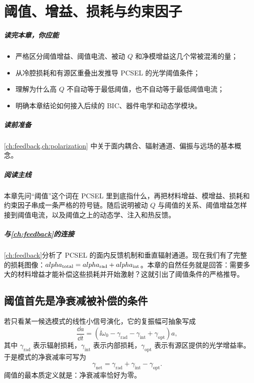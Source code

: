 ﻿%
\chapter{阈值、增益、损耗与约束因子}
\label{ch:threshold}

\paragraph{读完本章，你应能}
\begin{itemize}
  \item 严格区分阈值增益、阈值电流、被动 $Q$ 和净模增益这几个常被混淆的量；
  \item 从冷腔损耗和有源区重叠出发推导 PCSEL 的光学阈值条件；
  \item 理解为什么高 $Q$ 不自动等于最低阈值，也不自动等于最低阈值电流；
  \item 明确本章结论如何接入后续的 BIC、器件电学和动态学模块。
\end{itemize}

\paragraph{读前准备}
\cref{ch:feedback,ch:polarization} 中关于面内耦合、辐射通道、偏振与远场的基本概念。

\paragraph{阅读主线}
本章先问“阈值”这个词在 PCSEL 里到底指什么，再把材料增益、模增益、损耗和约束因子串成一条严格的符号链。随后说明被动 $Q$ 与阈值的关系、阈值增益怎样接到阈值电流，以及阈值之上的动态学、注入和热反馈。
\paragraph{与\cref{ch:feedback}的连接} \cref{ch:feedback}分析了 PCSEL 的面内反馈机制和垂直辐射通道。现在我们有了完整的损耗图像：$\alpha_{\rm total} = \alpha_{\rm rad} + \alpha_{\rm int}$。本章的自然任务就是回答：需要多大的材料增益才能补偿这些损耗并开始激射？这就引出了阈值条件的严格推导。
\section{阈值首先是净衰减被补偿的条件}
若只看某一候选模式的线性小信号演化，它的复振幅可抽象写成
\[
\frac{\dd a}{\dd t}=\left(\ii\omega_0-\gamma_{\mathrm{rad}}-\gamma_{\mathrm{int}}+\gamma_{\mathrm{opt}}\right)a,
\]
其中 $\gamma_{\mathrm{rad}}$ 表示辐射损耗，$\gamma_{\mathrm{int}}$ 表示内部损耗，$\gamma_{\mathrm{opt}}$ 表示有源区提供的光学增益率。于是模式的净衰减率可写为
\begin{equation}
\gamma_{\mathrm{net}} = \gamma_{\mathrm{rad}} + \gamma_{\mathrm{int}} - \gamma_{\mathrm{opt}}.
\label{eq:gamma_net}
\end{equation}
阈值的最本质定义就是：净衰减率恰好为零。

